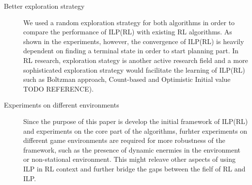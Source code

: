 \begin{description}
    \item[Better exploration strategy]
    We used a random exploration strategy for both algorithms in order to compare the performance of ILP(RL) with existing RL algorithms. 
    As shown in the experiments, however, the convergence of ILP(RL) is heavily dependent on finding a terminal state in order to start planning part.
    In RL research, exploration stategy is another active research field and a more sophisticated exploration strategy would facilitate the learning of ILP(RL)
    such as Boltzman approach, Count-based and Optimistic Initial value TODO REFERENCE).
    \item[Experiments on different environments]
    Since the purpose of this paper is develop the initial framework of ILP(RL) and experiments on the core part of the algorithms,
    furhter experiments on different game environments are required for more robustness of the framework, such as the presence of dynamic enermies in the environment or non-stational environment.
    This might releave other aspects of using ILP in RL context and further bridge the gaps between the fielf of RL and ILP.


\end{description}
